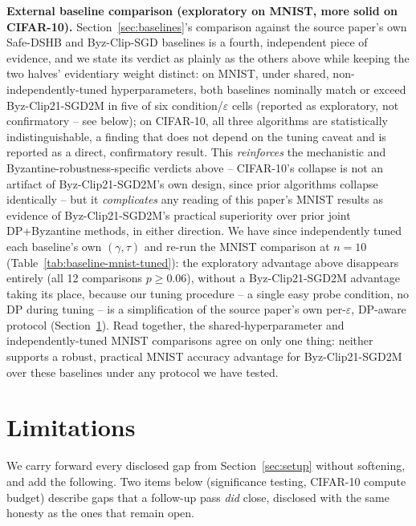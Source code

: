 \documentclass{article}
\begin{document}
\textbf{External baseline comparison (exploratory on MNIST, more solid on
CIFAR-10).} Section~\ref{sec:baselines}'s comparison against the source
paper's own Safe-DSHB and Byz-Clip-SGD baselines is a fourth, independent
piece of evidence, and we state its verdict as plainly as the others above
while keeping the two halves' evidentiary weight distinct: on MNIST, under
shared, non-independently-tuned hyperparameters, both baselines nominally
match or exceed Byz-Clip21-SGD2M in five of six condition/$\varepsilon$
cells (reported as exploratory, not confirmatory -- see below); on CIFAR-10,
all three algorithms are statistically indistinguishable, a finding that does
not depend on the tuning caveat and is reported as a direct, confirmatory
result.
This \emph{reinforces} the mechanistic and Byzantine-robustness-specific
verdicts above -- CIFAR-10's collapse is not an artifact of Byz-Clip21-SGD2M's
own design, since prior algorithms collapse identically -- but it
\emph{complicates} any reading of this paper's MNIST results as evidence of
Byz-Clip21-SGD2M's practical superiority over prior joint DP+Byzantine
methods, in either direction. We have since independently tuned each
baseline's own $(\gamma,\tau)$ and re-run the MNIST comparison at $n{=}10$
(Table~\ref{tab:baseline-mnist-tuned}): the exploratory advantage above
disappears entirely (all 12 comparisons $p\geq0.06$), without a
Byz-Clip21-SGD2M advantage taking its place, because our tuning procedure --
a single easy probe condition, no DP during tuning -- is a simplification of
the source paper's own per-$\varepsilon$, DP-aware protocol
(Section~\ref{sec:limitations}). Read together, the shared-hyperparameter and
independently-tuned MNIST comparisons agree on only one thing: neither
supports a robust, practical MNIST accuracy advantage for Byz-Clip21-SGD2M
over these baselines under any protocol we have tested.

\section{Limitations}
\label{sec:limitations}
We carry forward every disclosed gap from Section~\ref{sec:setup} without
softening, and add the following. Two items below (significance testing,
CIFAR-10 compute budget) describe gaps that a follow-up pass \emph{did}
close, disclosed with the same honesty as the ones that remain open.
\end{document}
